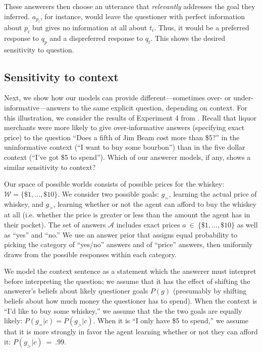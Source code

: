 \documentclass[11pt, floatsintext]{apa6}
\begin{document}
These answerers then choose an utterance that \emph{relevantly} addresses the goal they inferred. $a_{p_i}$, for instance, would leave the questioner with perfect information about $p_i$ but gives no information at all about $t_i$. Thus, it would be a preferred response to $q_p$ and a dispreferred response to $q_t$. This shows the desired sensitivity to question.

\subsection{Sensitivity to context}

Next, we show how our models can provide different---sometimes over- or under-informative---answers to the same explicit question, depending on context. For this illustration, we consider the results of Experiment 4 from . Recall that liquor merchants were more likely to give over-informative answers (specifying exact price) to the question ``Does a fifth of Jim Beam cost more than \$5?'' in the uninformative context (``I want to buy some bourbon'') than in the five dollar context (``I've got \$5 to spend''). Which of our answerer models, if any, shows a similar sensitivity to context?

Our space of possible worlds consists of possible prices for the whiskey: $\mathcal{W} = \{\$1, \dots, \$10\}$. We consider two possible goals: $g_=$, learning the actual price of whiskey,  and $g_>$, learning whether or not the agent can afford to buy the whiskey at all (i.e. whether the price is greater or less than the amount the agent has in their pocket). The set of answers $\mathcal{A}$ includes exact prices $a~\in~\{\$1, \dots, \$10\}$ as well as ``yes'' and ``no.'' We use an answer prior that assigns equal probability to picking the category of ``yes/no'' answers and of ``price'' answers, then uniformly draws from the possible responses within each category. 


We model the context sentence as a statement which the answerer must interpret before interpreting the question; we assume that it has the effect of shifting the answerer's beliefs about likely questioner goals $P(g)$ (presumably by shifting beliefs about how much money the questioner has to spend). When the context is ``I'd like to buy some whiskey,'' we assume that the the two goals are equally likely: $P(g_= | c) = P(g_> | c)$. When it is ``I only have \$5 to spend,'' we assume that it is more strongly in favor the agent learning whether or not they can afford it: $P(g_> | c)~=~.99$. 
\end{document}
